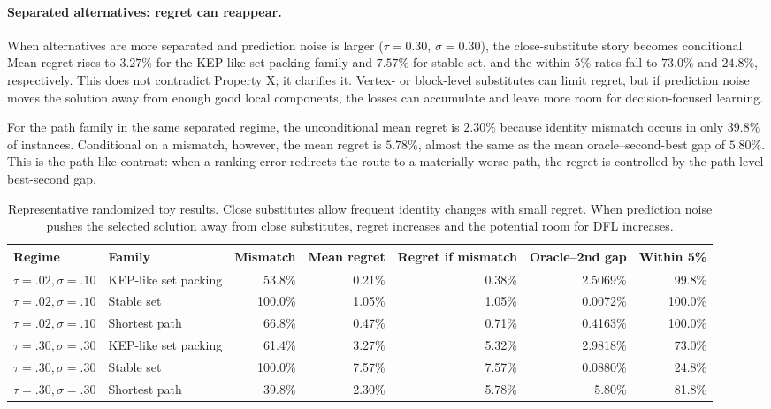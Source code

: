 \paragraph{Separated alternatives: regret can reappear.}
When alternatives are more separated and prediction noise is larger
($\tau=0.30$, $\sigma=0.30$), the close-substitute story becomes conditional.
Mean regret rises to $3.27\%$ for the KEP-like set-packing family and $7.57\%$
for stable set, and the within-$5\%$ rates fall to $73.0\%$ and $24.8\%$,
respectively. This does not contradict Property X; it clarifies it. Vertex- or
block-level substitutes can limit regret, but if prediction noise moves the
solution away from enough good local components, the losses can accumulate and
leave more room for decision-focused learning.

For the path family in the same separated regime, the unconditional mean regret
is $2.30\%$ because identity mismatch occurs in only $39.8\%$ of instances.
Conditional on a mismatch, however, the mean regret is $5.78\%$, almost the
same as the mean oracle--second-best gap of $5.80\%$. This is the path-like
contrast: when a ranking error redirects the route to a materially worse path,
the regret is controlled by the path-level best-second gap.

\begin{table}[t]
\centering
\small
\setlength{\tabcolsep}{4pt}
\begin{tabular}{@{}llrrrrr@{}}
\toprule
Regime & Family & Mismatch & Mean regret & Regret if mismatch & Oracle--2nd gap & Within 5\% \\
\midrule
$\tau=.02,\sigma=.10$ & KEP-like set packing & 53.8\% & 0.21\% & 0.38\% & 2.5069\% & 99.8\% \\
$\tau=.02,\sigma=.10$ & Stable set & 100.0\% & 1.05\% & 1.05\% & 0.0072\% & 100.0\% \\
$\tau=.02,\sigma=.10$ & Shortest path & 66.8\% & 0.47\% & 0.71\% & 0.4163\% & 100.0\% \\
\midrule
$\tau=.30,\sigma=.30$ & KEP-like set packing & 61.4\% & 3.27\% & 5.32\% & 2.9818\% & 73.0\% \\
$\tau=.30,\sigma=.30$ & Stable set & 100.0\% & 7.57\% & 7.57\% & 0.0880\% & 24.8\% \\
$\tau=.30,\sigma=.30$ & Shortest path & 39.8\% & 2.30\% & 5.78\% & 5.80\% & 81.8\% \\
\bottomrule
\end{tabular}
\caption{Representative randomized toy results. Close substitutes allow
frequent identity changes with small regret. When prediction noise pushes the
selected solution away from close substitutes, regret increases and the
potential room for DFL increases.}
\label{tab:randomized-toy-summary}
\end{table}

